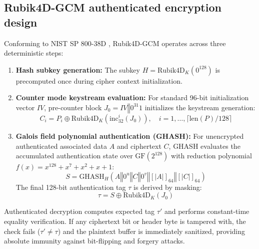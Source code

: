 \documentclass[10pt,twocolumn]{article}
\begin{document}
\subsection{Rubik4D-GCM authenticated encryption design}
Conforming to NIST SP 800-38D \cite{dworkin2007gcm}, Rubik4D-GCM operates across three deterministic steps:
\begin{enumerate}
    \item \textbf{Hash subkey generation:} The subkey $H = \text{Rubik4D}_K(0^{128})$ is precomputed once during cipher context initialization.
    \item \textbf{Counter mode keystream evaluation:} For standard 96-bit initialization vector $IV$, pre-counter block $J_0 = IV \mathbin{\Vert} 0^{31}1$ initializes the keystream generation:
    \begin{equation}
        C_i = P_i \oplus \text{Rubik4D}_K(\text{inc}_{32}^i(J_0)), \quad i = 1, \dots, \lceil \text{len}(P)/128 \rceil
    \end{equation}
    \item \textbf{Galois field polynomial authentication (GHASH):} For unencrypted authenticated associated data $A$ and ciphertext $C$, GHASH evaluates the accumulated authentication state over $\text{GF}(2^{128})$ with reduction polynomial $f(x) = x^{128} + x^7 + x^2 + x + 1$:
    \begin{equation}
        S = \text{GHASH}_H(A \mathbin{\Vert} 0^u \mathbin{\Vert} C \mathbin{\Vert} 0^v \mathbin{\Vert} [|A|]_{64} \mathbin{\Vert} [|C|]_{64})
    \end{equation}
    The final 128-bit authentication tag $\tau$ is derived by masking:
    \begin{equation}
        \tau = S \oplus \text{Rubik4D}_K(J_0)
    \end{equation}
\end{enumerate}

Authenticated decryption computes expected tag $\tau'$ and performs constant-time equality verification. If any ciphertext bit or header byte is tampered with, the check fails ($\tau' \neq \tau$) and the plaintext buffer is immediately sanitized, providing absolute immunity against bit-flipping and forgery attacks.
\end{document}
